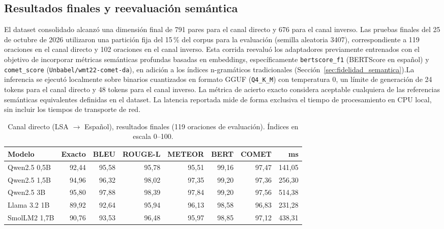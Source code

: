 \subsection{Resultados finales y reevaluación semántica}
\label{sec:eval_semantica_cuant}
El dataset consolidado alcanzó una dimensión final de 791 pares para el canal directo y 676 para el canal inverso. Las pruebas finales del 25 de octubre de 2026 utilizaron una partición fija del 15\,\% del corpus para la evaluación (semilla aleatoria 3407), correspondiente a 119 oraciones en el canal directo y 102 oraciones en el canal inverso. Esta corrida reevaluó los adaptadores previamente entrenados con el objetivo de incorporar métricas semánticas profundas basadas en embeddings, específicamente \texttt{bertscore\_f1} (BERTScore en español) y \texttt{comet\_score} (\texttt{Unbabel/wmt22-comet-da}), en adición a los índices n-gramáticos tradicionales (Sección~\ref{sec:fidelidad_semantica}).La inferencia se ejecutó localmente sobre binarios cuantizados en formato GGUF (\texttt{Q4\_K\_M}) con temperatura 0, un límite de generación de 24 tokens para el canal directo y 48 tokens para el canal inverso. La métrica de acierto exacto considera aceptable cualquiera de las referencias semánticas equivalentes definidas en el dataset. La latencia reportada mide de forma exclusiva el tiempo de procesamiento en CPU local, sin incluir los tiempos de transporte de red.

\begin{table}[H]
\centering
\footnotesize
\caption{Canal directo (LSA $\rightarrow$ Español), resultados finales (119 oraciones de evaluación). Índices en escala 0--100.}
\label{tab:sem_directo}
\begin{tabular}{lrrrrrrr}
\toprule
\textbf{Modelo} & \textbf{Exacto} & \textbf{BLEU} & \textbf{ROUGE-L} & \textbf{METEOR} & \textbf{BERT} & \textbf{COMET} & \textbf{ms} \\
\midrule
Qwen2.5 0,5B & 92,44 & 95,58 & 95,78 & 95,51 & 99,16 & 97,47 & 141,05 \\
Qwen2.5 1,5B & 94,96 & 96,32 & 98,02 & 97,35 & 99,20 & 97,36 & 256,30 \\
Qwen2.5 3B   & 95,80 & 97,88 & 98,39 & 97,84 & 99,20 & 97,56 & 514,38 \\
Llama 3.2 1B & 89,92 & 92,64 & 95,94 & 96,13 & 98,58 & 96,83 & 231,28 \\
SmolLM2 1,7B & 90,76 & 93,53 & 96,48 & 95,97 & 98,85 & 97,12 & 438,31 \\
\bottomrule
\end{tabular}
\end{table}

